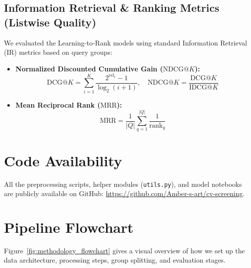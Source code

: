 \documentclass[12pt,a4paper,oneside]{report}
\begin{document}
\subsection{Information Retrieval \& Ranking Metrics (Listwise Quality)}
We evaluated the Learning-to-Rank models using standard Information Retrieval (IR) metrics based on query groups:
\begin{itemize}
    \item \textbf{Normalized Discounted Cumulative Gain ($\text{NDCG}@K$):}
    \begin{equation}
    \text{DCG}@K = \sum_{i=1}^{K} \frac{2^{\text{rel}_i} - 1}{\log_2(i + 1)}, \quad \text{NDCG}@K = \frac{\text{DCG}@K}{\text{IDCG}@K}
    \end{equation}

    \item \textbf{Mean Reciprocal Rank ($\text{MRR}$):}
    \begin{equation}
    \text{MRR} = \frac{1}{|Q|} \sum_{q=1}^{|Q|} \frac{1}{\text{rank}_q}
    \end{equation}
\end{itemize}

\section{Code Availability}
All the preprocessing scripts, helper modules (\texttt{utils.py}), and model notebooks are publicly available on GitHub: \url{https://github.com/Amber-s-art/cv-screening}.

\section{Pipeline Flowchart}
Figure~\ref{fig:methodology_flowchart} gives a visual overview of how we set up the data architecture, processing steps, group splitting, and evaluation stages.
\end{document}
